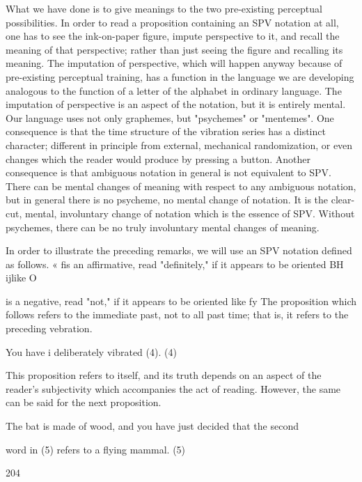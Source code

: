 \documentclass[10pt,twoside]{memoir}
\begin{document}
\begin{enumerate}
{\begin{enumerate}
\begin{sysrules}
\begin{sysrules}
\begin{sysrules}
\begin{sysrules}
{\begin{enumerate}
{{{{{{{{{{What we have done is to give meanings to the two pre-existing 
perceptual possibilities. In order to read a proposition containing an SPV 
notation at all, one has to see the ink-on-paper figure, impute perspective to 
it, and recall the meaning of that perspective; rather than just seeing the 
figure and recalling its meaning. The imputation of perspective, which will 
happen anyway because of pre-existing perceptual training, has a function in 
the language we are developing analogous to the function of a letter of the 
alphabet in ordinary language. The imputation of perspective is an aspect of 
the notation, but it is entirely mental. Our language uses not only 
graphemes, but "psychemes" or "mentemes". One consequence is that the 
time structure of the vibration series has a distinct character; different in 
principle from external, mechanical randomization, or even changes which 
the reader would produce by pressing a button. Another consequence is that 
ambiguous notation in general is not equivalent to SPV. There can be mental 
changes of meaning with respect to any ambiguous notation, but in general 
there is no psycheme, no mental change of notation. It is the clear-cut, 
mental, involuntary change of notation which is the essence of SPV. Without 
psychemes, there can be no truly involuntary mental changes of meaning. 


In order to illustrate the preceding remarks, we will use an SPV 
notation defined as follows. 
« fis an affirmative, read "definitely," if it appears to be oriented 
BH ijlike O 

is a negative, read "not," if it appears to be oriented like fy 
The proposition which follows refers to the immediate past, not to all past 
time; that is, it refers to the preceding vebration. 

You have i deliberately vibrated (4). (4) 


This proposition refers to itself, and its truth depends on an aspect of the 
reader's subjectivity which accompanies the act of reading. However, the 
same can be said for the next proposition. 

The bat is made of wood, and you have just decided that the second 


word in (5) refers to a flying mammal. (5) 


204 


}}}}}}}}}}
\end{enumerate}}
\end{sysrules}
\end{sysrules}
\end{sysrules}
\end{sysrules}
\end{enumerate}}
\end{enumerate}
\end{document}
